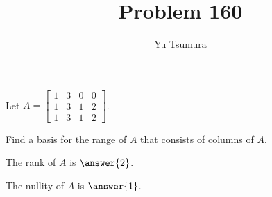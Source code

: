 \documentclass{ximera}
\title{Problem 160}
\author{Yu Tsumura}
\begin{document}
\begin{problem}

  Let $A=\begin{bmatrix}
    1 & 3 & 0 &   0 \\
    1 &3 &  1 & 2  \\
    1 & 3 & 1 & 2
  \end{bmatrix}$.
  
  Find a basis for the range of $A$ that consists of columns of $A$.

  \begin{multipleChoice}
  \end{multipleChoice}
  
  The rank of $A$ is $\answer{2}$.
  
  The nullity of $A$ is $\answer{1}$.
  
\end{problem}
          
\end{document}
